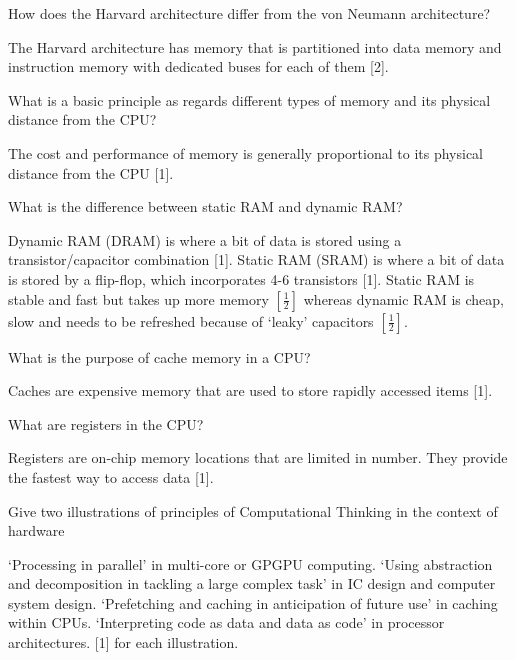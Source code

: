 \documentclass{exam}
\begin{document}
\begin{questions}
\question[2]How does the Harvard architecture differ from the von Neumann architecture?
\begin{solution}[2in]
The Harvard architecture has memory that is partitioned into data
memory and instruction memory with dedicated buses for each of them
[2].
\end{solution}
\newpage
\question[1]What is a basic principle as regards different types of memory and its physical distance from the CPU?
\begin{solution}[2in]
The cost and performance of memory is generally proportional to its
physical distance from the CPU [1].
\end{solution}

\question[3]What is the difference between static RAM and dynamic RAM?
\begin{solution}[2in]
Dynamic RAM (DRAM) is where a bit of data is stored using a transistor/capacitor
combination [1]. Static RAM (SRAM) is where a bit
of data is stored by a flip-flop, which incorporates 4-6 transistors [1].
Static RAM is stable and fast but takes up more memory $[\frac{1}{2}]$ whereas
dynamic RAM is cheap, slow and needs to be refreshed because of
‘leaky’ capacitors $[\frac{1}{2}]$.
\end{solution}


\question[1]What is the purpose of cache memory in a CPU?
\begin{solution}[2in]
Caches are expensive memory that are used to store rapidly accessed
items [1].
\end{solution}

\question[1]What are registers in the CPU?
\begin{solution}[2in]
Registers are on-chip memory locations that are limited in number.
They provide the fastest way to access data [1].
\end{solution}

\question[2]Give two illustrations of principles of Computational Thinking in the context of hardware
\begin{solution}[2in]
	‘Processing in parallel’ in multi-core or GPGPU computing. ‘Using
	abstraction and decomposition in tackling a large complex task’ in IC
	design and computer system design. ‘Prefetching and caching in anticipation
	of future use’ in caching within CPUs. ‘Interpreting code as data
	and data as code’ in processor architectures. [1] for each illustration.
\end{solution}





\end{questions}
\end{document}
